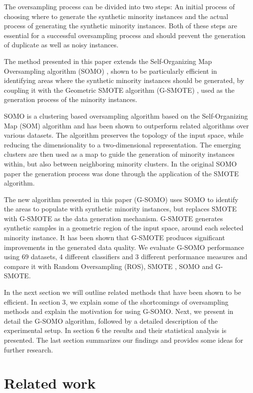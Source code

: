 \documentclass[parskip=full]{scrartcl}
\begin{document}
The oversampling process can be divided into two steps: An initial process of choosing where to generate the synthetic minority instances and the actual process of generating the synthetic minority instances. Both of these steps are essential for a successful oversampling process and should prevent the generation of duplicate as well as noisy instances.

The method presented in this paper extends the Self-Organizing Map Oversampling algorithm (SOMO) \cite{Douzas2017}, shown to be particularly efficient in identifying areas where the synthetic minority instances should be generated, by coupling it with the Geometric SMOTE algorithm (G-SMOTE) \cite{Douzas2019}, used as the generation process of the minority instances.

SOMO is a clustering based oversampling algorithm based on the Self-Organizing Map (SOM) algorithm and has been shown to outperform related algorithms over various datasets. The algorithm preserves the topology of the input space, while reducing the dimensionality to a two-dimensional representation. The emerging clusters are then used as a map to guide the generation of minority instances within, but also between neighboring minority clusters. In the original SOMO paper the generation process was done through the application of the SMOTE algorithm.

The new algorithm presented in this paper (G-SOMO) uses SOMO to identify the areas to populate with synthetic minority instances, but replaces SMOTE with G-SMOTE as the data generation mechanism. G-SMOTE generates synthetic samples in a geometric region of the input space, around each selected minority instance. It has been shown that G-SMOTE produces significant improvements in the generated data quality. We evaluate G-SOMO performance using 69 datasets, 4 different classifiers and 3 different performance measures and compare it with Random Oversampling (ROS), SMOTE \cite{Chawla2002}, SOMO and G-SMOTE.

In the next section we will outline related methods that have been shown to be efficient. In section 3, we explain some of the shortcomings of oversampling methods and explain the motivation for using G-SOMO. Next, we present in detail the G-SOMO algorithm, followed by a detailed description of the experimental setup. In section 6 the results and their statistical analysis is presented. The last section summarizes our findings and provides some ideas for further research.

\section{Related work}
\end{document}
